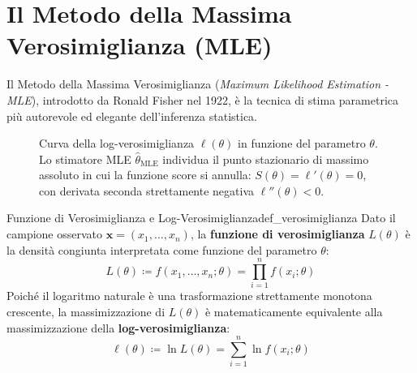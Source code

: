 \section{Il Metodo della Massima Verosimiglianza (MLE)}
\label{sec:mle_metodo}

Il Metodo della Massima Verosimiglianza (\emph{Maximum Likelihood Estimation - MLE}), introdotto da Ronald Fisher nel 1922, è la tecnica di stima parametrica più autorevole ed elegante dell'inferenza statistica.

\begin{figure}[htbp]
    \centering
    
    \caption{Curva della log-verosimiglianza $\ell(\theta)$ in funzione del parametro $\theta$. Lo stimatore MLE $\widehat{\theta}_{\text{MLE}}$ individua il punto stazionario di massimo assoluto in cui la funzione score si annulla: $S(\theta) = \ell'(\theta) = 0$, con derivata seconda strettamente negativa $\ell''(\theta) < 0$.}
    \label{fig:mle_curva}
    \end{figure}

\begin{definizione}{Funzione di Verosimiglianza e Log-Verosimiglianza}{def_verosimiglianza}
Dato il campione osservato $\mathbf{x} = (x_1, \dots, x_n)$, la \textbf{funzione di verosimiglianza} $L(\theta)$ è la densità congiunta interpretata come funzione del parametro $\theta$:
\begin{equation}
    L(\theta) \coloneqq f(x_1, \dots, x_n; \theta) = \prod_{i=1}^n f(x_i; \theta)
\end{equation}
Poiché il logaritmo naturale è una trasformazione strettamente monotona crescente, la massimizzazione di $L(\theta)$ è matematicamente equivalente alla massimizzazione della \textbf{log-verosimiglianza}:
\begin{equation}
    \ell(\theta) \coloneqq \ln L(\theta) = \sum_{i=1}^n \ln f(x_i; \theta)
\end{equation}
\end{definizione}

